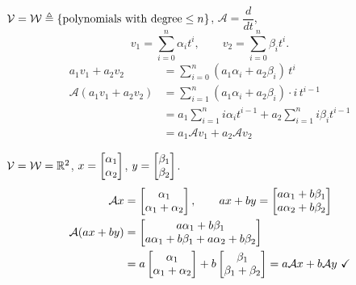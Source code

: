 \begin{example}\leavevmode{}
$\mathcal{V}=\mathcal{W} \triangleq \{\text{polynomials with degree} \le n\}$, \quad $\mathcal{A} = \dfrac{d}{dt}$,
\[
v_1=\sum_{i=0}^{n}\alpha_i t^i, \qquad v_2=\sum_{i=0}^{n}\beta_i t^i .
\]
\begin{align*}
a_1v_1+a_2v_2 &= \sum_{i=0}^{n}(a_1\alpha_i+a_2\beta_i)\,t^i\\
\mathcal{A}(a_1v_1+a_2v_2) &= \sum_{i=1}^{n}(a_1\alpha_i+a_2\beta_i)\cdot i\, t^{i-1}\\
&= a_1\sum_{i=1}^{n} i\alpha_i t^{i-1} + a_2\sum_{i=1}^{n} i\beta_i t^{i-1}\\
&= a_1\mathcal{A}v_1+a_2\mathcal{A}v_2
\end{align*}
\end{example}

\begin{example}
$\mathcal{V}=\mathcal{W}=\mathbb{R}^2$, \quad $x=\begin{bmatrix}\alpha_1\\ \alpha_2\end{bmatrix}$, \quad $y=\begin{bmatrix}\beta_1\\ \beta_2\end{bmatrix}$.
\begin{align*}
\mathcal{A}x &= \begin{bmatrix}\alpha_1\\ \alpha_1+\alpha_2\end{bmatrix}, \qquad
ax+by=\begin{bmatrix}a\alpha_1+b\beta_1\\ a\alpha_2+b\beta_2\end{bmatrix}\\
\mathcal{A}(ax+by) &= \begin{bmatrix}a\alpha_1+b\beta_1\\ a\alpha_1+b\beta_1+a\alpha_2+b\beta_2\end{bmatrix}\\
&= a\begin{bmatrix}\alpha_1\\ \alpha_1+\alpha_2\end{bmatrix}+b\begin{bmatrix}\beta_1\\ \beta_1+\beta_2\end{bmatrix} = a\mathcal{A}x+b\mathcal{A}y \ \checkmark
\end{align*}
\end{example}

